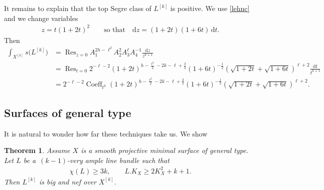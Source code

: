 \documentclass[11pt]{article}
\numberwithin{equation}{section}
\numberwithin{equation}{section}
\newtheorem{Theorem}{Theorem}[section]
\begin{document}
It remains to explain that the top Segre class of $L^{[k]}$ is positive. We use \eqref{lehnc} and we change variables
\begin{gather*}
z=t(1+2t)^2\qquad \text{so that}\quad \mathrm dz=(1+2t)(1+6t)\,{\mathrm dt}.
\end{gather*}
Then
\begin{align}
\int_{X^{[k]}} s\big(L^{[k]}\big)&=\operatorname{Res}_{z=0} A_1^{2h-\ell^2} A_2^2 A_3^{\ell} A_4^{-1} \frac{\mathrm dz}{z^{k+1}}\nonumber
\\
\nonumber&=
\operatorname{Res}_{t=0} 2^{-\ell-2} (1+2t)^{h-\frac{\ell^2}{2}-2k-\ell+\frac{3}{2}} (1+6t)^{-\frac{1}{2}} \left(\sqrt{1+2t}+\sqrt{1+6t}\right)^{\ell+2}\frac{\mathrm dt}{t^{k+1}}
\\
&= 2^{-\ell-2} \operatorname{Coeff}_{t^k} (1\!+2t)^{h-\frac{\ell^2}{2}-2k-\ell+\frac{3}{2}} (1\!+6t)^{-\frac{1}{2}} \left(\sqrt{1+2t}\!+\sqrt{1+6t}\right)^{\ell+2}\!.
\label{cvvv}
\end{align}


\subsection{Surfaces of general type} It is natural to wonder how far these techniques take us. We show

\begin{Theorem} \label{gtyp}Assume $X$ is a smooth projective minimal surface of general type. Let $L$ be a~$(k-1)$-very ample line bundle such that
\begin{gather*}
\chi(L)\geq 3k, \qquad L.K_X\geq 2K_X^2+k+1.
\end{gather*}
Then $L^{[k]}$ is big and nef over $X^{[k]}$.
\end{Theorem}
\end{document}
